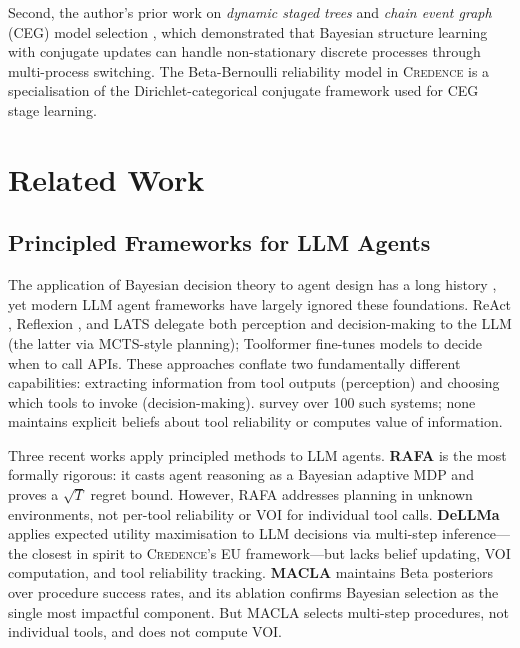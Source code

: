 \documentclass[11pt]{article}
\newcommand{\credence}{\textsc{Credence}}
\begin{document}
Second, the author's prior work on \emph{dynamic staged trees} \citep{freeman2011dynamic} and \emph{chain event graph} (CEG) model selection \citep{freeman2011bayesian}, which demonstrated that Bayesian structure learning with conjugate updates can handle non-stationary discrete processes through multi-process switching. The Beta-Bernoulli reliability model in \credence{} is a specialisation of the Dirichlet-categorical conjugate framework used for CEG stage learning.


\section{Related Work}
\label{sec:related}

\subsection{Principled Frameworks for LLM Agents}

The application of Bayesian decision theory to agent design has a long history \citep{russell1991principles, boutilier1999decision, kaelbling1998planning}, yet modern LLM agent frameworks have largely ignored these foundations. ReAct \citep{yao2023react}, Reflexion \citep{shinn2023reflexion}, and LATS \citep{zhou2024lats} delegate both perception and decision-making to the LLM (the latter via MCTS-style planning); Toolformer \citep{schick2023toolformer} fine-tunes models to decide when to call APIs. These approaches conflate two fundamentally different capabilities: extracting information from tool outputs (perception) and choosing which tools to invoke (decision-making). \citet{wang2023llmagent} survey over 100 such systems; none maintains explicit beliefs about tool reliability or computes value of information.

Three recent works apply principled methods to LLM agents. \textbf{RAFA} \citep{liu2024rafa} is the most formally rigorous: it casts agent reasoning as a Bayesian adaptive MDP and proves a $\sqrt{T}$ regret bound. However, RAFA addresses planning in unknown environments, not per-tool reliability or VOI for individual tool calls. \textbf{DeLLMa} \citep{liu2025dellma} applies expected utility maximisation to LLM decisions via multi-step inference---the closest in spirit to \credence{}'s EU framework---but lacks belief updating, VOI computation, and tool reliability tracking. \textbf{MACLA} \citep{forouzandeh2026macla} maintains Beta posteriors over procedure success rates, and its ablation confirms Bayesian selection as the single most impactful component. But MACLA selects multi-step procedures, not individual tools, and does not compute VOI.
\end{document}
